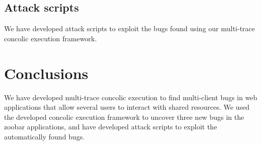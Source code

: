 \documentclass{llncs}
\begin{document}

\subsection{Attack scripts}

We have developed attack scripts to exploit the bugs found using our
multi-trace concolic execution framework.

\section{Conclusions}

We have developed multi-trace concolic execution to find multi-client
bugs in web applications that allow several users to interact with
shared resources. We used the developed concolic execution framework
to uncover three new bugs in the zoobar applications, and have
developed attack scripts to exploit the automatically found bugs.
\end{document}
